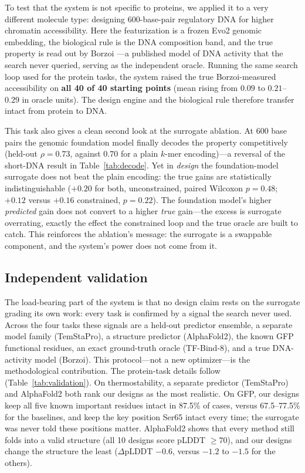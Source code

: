 \documentclass{article}
\begin{document}
To test that the system is not specific to proteins, we applied it to a very different
molecule type: designing 600-base-pair regulatory DNA for higher chromatin accessibility.
Here the featurization is a frozen Evo2 genomic embedding, the biological rule is the
DNA composition band, and the true property is read out by Borzoi
\citep{linder2025borzoi}---a published model of DNA activity that the search never queried,
serving as the independent oracle. Running the same search loop used for the protein tasks,
the system raised the true Borzoi-measured accessibility on \textbf{all 40 of 40 starting
points} (mean rising from $0.09$ to $0.21$--$0.29$ in oracle units). The design engine and
the biological rule therefore transfer intact from protein to DNA.

This task also gives a clean second look at the surrogate ablation. At 600 base pairs the
genomic foundation model finally decodes the property competitively (held-out $\rho=0.73$,
against $0.70$ for a plain $k$-mer encoding)---a reversal of the short-DNA result in
Table~\ref{tab:decode}. Yet in \emph{design} the foundation-model surrogate does not beat the
plain encoding: the true gains are statistically indistinguishable ($+0.20$ for both,
unconstrained, paired Wilcoxon $p=0.48$; $+0.12$ versus $+0.16$ constrained, $p=0.22$). The
foundation model's higher \emph{predicted} gain does not convert to a higher \emph{true}
gain---the excess is surrogate overrating, exactly the effect the constrained loop and the
true oracle are built to catch. This reinforces the ablation's message: the surrogate is a
swappable component, and the system's power does not come from it.

\subsection{Independent validation}

The load-bearing part of the system is that no design claim rests on the surrogate grading
its own work: every task is confirmed by a signal the search never used. Across the four
tasks these signals are a held-out predictor ensemble, a separate model family (TemStaPro),
a structure predictor (AlphaFold2), the known GFP functional residues, an exact ground-truth
oracle (TF-Bind-8), and a true DNA-activity model (Borzoi). This protocol---not a new
optimizer---is the methodological contribution. The protein-task details follow
(Table~\ref{tab:validation}). On thermostability, a separate predictor (TemStaPro) and
AlphaFold2 both rank our designs as the most realistic. On GFP, our designs keep all five
known important residues intact in 87.5\% of cases, versus 67.5--77.5\% for the baselines,
and keep the key position Ser65 intact every time; the surrogate was never told these
positions matter. AlphaFold2 shows that every method still folds into a valid structure
(all 10 designs score pLDDT $\ge 70$), and our designs change the structure the least
($\Delta$pLDDT $-0.6$, versus $-1.2$ to $-1.5$ for the others).
\end{document}

